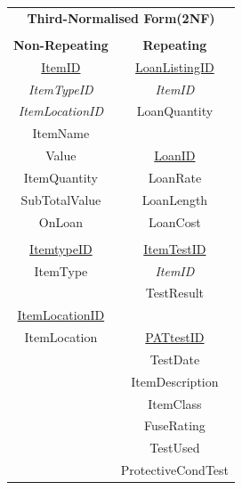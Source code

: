 \begin{center}
    \begin{tabular}{|c|c|}
        \hline
        \multicolumn{2}{|c|}{\textbf{Third-Normalised Form(2NF)}}  \\
        \multicolumn{2}{|c|}{ }                                    \\ \hline
        \textbf{Non-Repeating}     & \textbf{Repeating}            \\ \hline
        \underline{ItemID}         & \underline{LoanListingID}     \\
        \emph{ItemTypeID}          & \emph{ItemID}                 \\
        \emph{ItemLocationID}      & LoanQuantity                  \\
        ItemName                   &                               \\
        Value                      & \underline{LoanID}            \\
        ItemQuantity               & LoanRate                      \\
        SubTotalValue              & LoanLength                    \\
        OnLoan                     & LoanCost                      \\
                                   &                               \\
        \underline{ItemtypeID}     & \underline{ItemTestID}        \\
        ItemType                   & \emph{ItemID}                 \\
                                   & TestResult                    \\
        \underline{ItemLocationID} &                               \\
        ItemLocation               & \underline{PATtestID}         \\
                                   & TestDate                      \\
                                   & ItemDescription               \\          
                                   & ItemClass                     \\          
                                   & FuseRating                    \\ 
                                   & TestUsed                      \\ 
                                   & ProtectiveCondTest            \\ 

\end{tabular}
\end{center}

